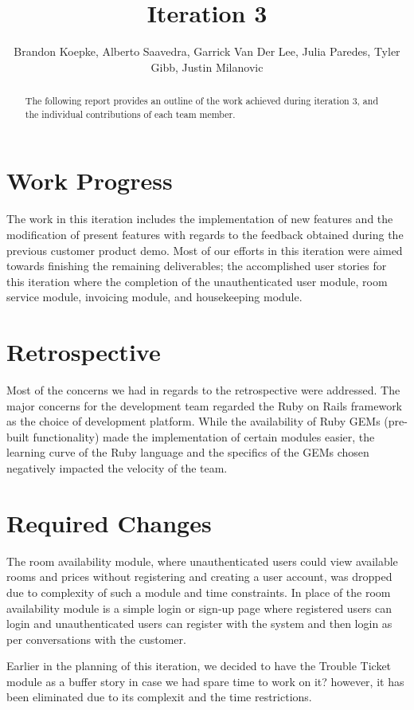 \documentclass[12pt]{elsarticle}
\begin{document}
\begin{frontmatter}
  \title{Iteration 3}
  \author{Brandon Koepke, Alberto Saavedra, Garrick Van Der Lee, Julia Paredes, Tyler Gibb, Justin Milanovic}
	\begin{abstract}
		The following report provides an outline of the work achieved during iteration 3, and the individual contributions of each team member.
	\end{abstract}
\end{frontmatter}
\tableofcontents
\listoffigures
\clearpage

\section{Work Progress}

The work in this iteration includes the implementation of new features and the modification of present features with regards to the feedback obtained during the previous customer product demo. Most of our efforts in this iteration were aimed towards finishing the remaining deliverables; the accomplished user stories for this iteration where the completion of the unauthenticated user module, room service module, invoicing module, and housekeeping module.
\section{Retrospective}
Most of the concerns we had in regards to the retrospective were addressed. The major concerns for the development team regarded the Ruby on Rails framework as the choice of development platform. While the availability of Ruby GEMs (pre-built functionality) made the implementation of certain modules easier, the learning curve of the Ruby language and the specifics of the GEMs chosen negatively impacted the velocity of the team.
\section{Required Changes}
The room availability module, where unauthenticated users could view available rooms and prices without registering and creating a user account, was dropped due to complexity of such a module and time constraints. In place of the room availability module is a simple login or sign-up page where registered users can login and unauthenticated users can register with the system and then login as per conversations with the customer.

Earlier in the planning of this iteration, we decided to have the Trouble Ticket module as a buffer story in case we had spare time to work on it? however, it has been eliminated due to its complexit and the time restrictions.
\end{document}
